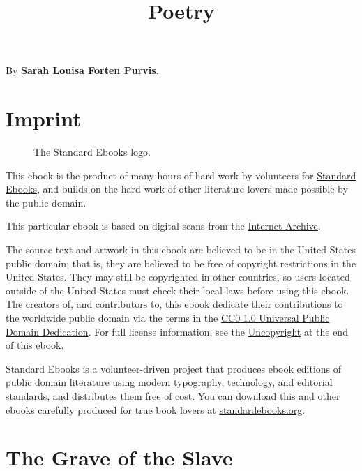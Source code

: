 \documentclass[11pt,a4paper]{article}
\title{Poetry}
\begin{document}
\maketitle

By \textbf{Sarah Louisa Forten Purvis}.

\begin{figure}[h]
\end{figure}

\section{Imprint}

\begin{figure}[h]
\caption{The Standard Ebooks logo.}
\end{figure}

This ebook is the product of many hours of hard work by volunteers for \href{https://standardebooks.org/}{Standard Ebooks}, and builds on the hard work of other literature lovers made possible by the public domain.

This particular ebook is based on digital scans from the \href{https://standardebooks.org/ebooks/sarah-louisa-forten-purvis/poetry\#page-scans}{Internet Archive}.

The source text and artwork in this ebook are believed to be in the United States public domain; that is, they are believed to be free of copyright restrictions in the United States. They may still be copyrighted in other countries, so users located outside of the United States must check their local laws before using this ebook. The creators of, and contributors to, this ebook dedicate their contributions to the worldwide public domain via the terms in the \href{https://creativecommons.org/publicdomain/zero/1.0/}{CC0 1.0 Universal Public Domain Dedication}. For full license information, see the \href{uncopyright.xhtml}{Uncopyright} at the end of this ebook.

Standard Ebooks is a volunteer-driven project that produces ebook editions of public domain literature using modern typography, technology, and editorial standards, and distributes them free of cost. You can download this and other ebooks carefully produced for true book lovers at \href{https://standardebooks.org/}{standardebooks.org}.

\section{The Grave of the Slave}
\end{document}
